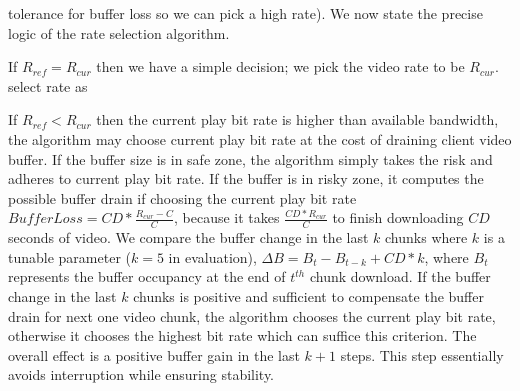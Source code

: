 tolerance for buffer loss so we can pick a high rate).
We now state the precise logic of the rate selection algorithm.



If $R_{ref}= R_{cur}$ then we have a simple decision; we pick the
video rate to be $ R_{cur}$.
select rate as 

If $R_{ref} < R_{cur}$ then the current play bit rate is higher than
available bandwidth, the 
algorithm may choose current play bit rate at the cost of draining
client video buffer. If the buffer size is in safe zone, the
algorithm simply takes the risk and adheres to current play bit rate. If the
buffer is in risky zone, it computes the possible buffer drain if
choosing the current play bit rate $BufferLoss
=CD*\frac{R_{cur}-C}{C}$, because it takes $\frac{CD*R_{cur}}{C}$ to finish downloading 
$CD$ seconds of video. 
We compare the buffer change in
the last $k$ chunks where $k$ is a tunable parameter ($k=5$ in evaluation), 
$\Delta B = B_{t} -B_{t-k} + CD*k$, where $B_{t}$
represents the buffer occupancy at the end of $t^{th}$ chunk
download. If the buffer change in the last $k$ chunks is positive and
sufficient to compensate the buffer drain for next one video chunk, the
algorithm chooses the current play bit rate, otherwise it chooses the
highest bit rate which can suffice this criterion. 
The overall effect is a positive buffer gain in the last $k+1$ steps.
This step essentially avoids interruption while ensuring stability. 

